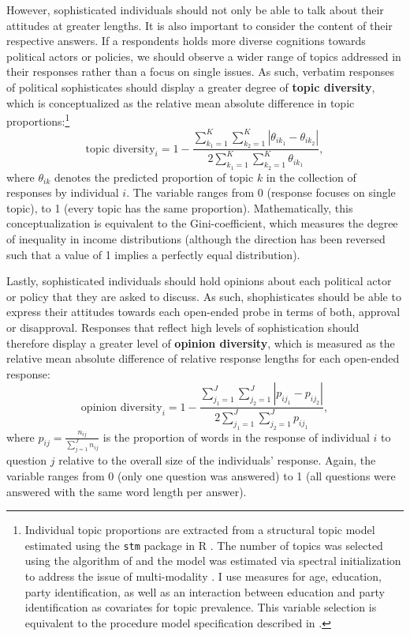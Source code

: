 \documentclass[12pt]{article}
\begin{document}
However, sophisticated individuals should not only be able to talk about their attitudes at greater lengths. It is also important to consider the content of their respective answers. If a respondents holds more diverse cognitions towards political actors or policies, we should observe a wider range of topics addressed in their responses rather than a focus on single issues. As such, verbatim responses of political sophisticates should display a greater degree of \textbf{topic diversity}, which is conceptualized as the relative mean absolute difference in topic proportions:\footnote{Individual topic proportions are extracted from a structural topic model estimated using the \texttt{stm} package in R \citep{roberts2014structural}. The number of topics was selected using the algorithm of \citet{lee2014low} and the model was estimated via spectral initialization to address the issue of multi-modality \citep[see][for details]{roberts2014stm}. I use measures for age, education, party identification, as well as an interaction between education and party identification as covariates for topic prevalence. This variable selection is equivalent to the procedure model specification described in \citet{roberts2014structural}. %
}
\begin{equation}
\text{topic diversity}_i = 1-\dfrac{\sum_{k_1=1}^K\sum_{k_2=1}^K |\theta_{ik_1} - \theta_{ik_2}|}{2\sum_{k_1=1}^K\sum_{k_2=1}^K \theta_{ik_1}},
\end{equation}
where $\theta_{ik}$ denotes the predicted proportion of topic $k$ in the collection of responses by individual $i$. The variable ranges from 0 (response focuses on single topic), to 1 (every topic has the same proportion). Mathematically, this conceptualization is equivalent to the Gini-coefficient, which measures the degree of inequality in income distributions (although the direction has been reversed such that a value of 1 implies a perfectly equal distribution).

Lastly, sophisticated individuals should hold opinions about each political actor or policy that they are asked to discuss. As such, shophisticates should be able to express their attitudes towards each open-ended probe in terms of both, approval or disapproval. Responses that reflect high levels of sophistication should therefore display a greater level of \textbf{opinion diversity}, which is measured as the relative mean absolute difference of relative response lengths for each open-ended response:
\begin{equation}
\text{opinion diversity}_i = 1-\dfrac{\sum_{j_1=1}^J\sum_{j_2=1}^J |p_{ij_1} - p_{ij_2}|}{2\sum_{j_1=1}^J\sum_{j_2=1}^J p_{ij_1}},
\end{equation}
where $p_{ij}=\tfrac{n_{ij}}{\sum_{j=1}^J n_{ij}}$ is the proportion of words in the response of individual $i$ to question $j$ relative to the overall size of the individuals' response. Again, the variable ranges from 0 (only one question was answered) to 1 (all questions were answered with the same word length per answer).
\end{document}
